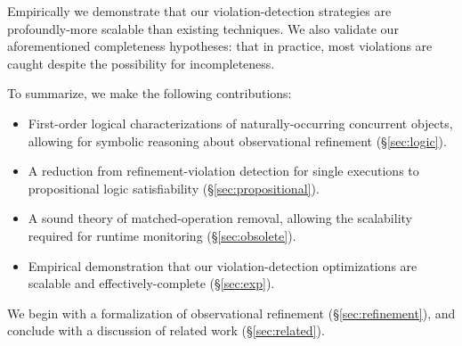 Empirically we demonstrate that our violation-detection strategies are
profoundly-more scalable than existing techniques. We also validate our
aforementioned completeness hypotheses: that in practice, most violations are
caught despite the possibility for incompleteness.

To summarize, we make the following contributions:
\begin{itemize}

  \item First-order logical characterizations of naturally-occurring concurrent
  objects, allowing for symbolic reasoning about observational refinement
  (\S\ref{sec:logic}).

  \item A reduction from refinement-violation detection for single executions
  to propositional logic satisfiability (\S\ref{sec:propositional}).
  
  \item A sound theory of matched-operation removal, allowing the scalability
  required for runtime monitoring (\S\ref{sec:obsolete}).
  
  \item Empirical demonstration that our violation-detection optimizations are
  scalable and effectively-complete (\S\ref{sec:exp}).

\end{itemize}
We begin with a formalization of observational refinement
(\S\ref{sec:refinement}), and conclude with a discussion of related work
(\S\ref{sec:related}).
